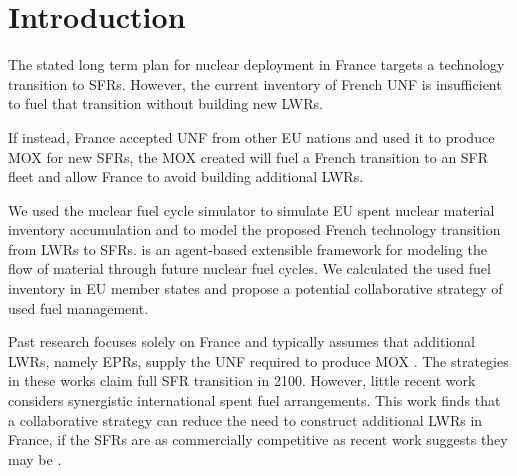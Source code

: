 
\section{Introduction}
The stated long term plan for nuclear deployment in France targets a technology 
transition to \glspl{SFR}\cite{cne2_reports_2015}. However, the current inventory of French \gls{UNF} 
is insufficient to fuel that transition without building new \glspl{LWR}.

If instead, France accepted 
\gls{UNF} from other \gls{EU} nations and used it to produce \gls{MOX} for new \glspl{SFR},
the \gls{MOX} created will fuel a French transition to an \gls{SFR} fleet
and allow France to avoid building additional \glspl{LWR}.


We used the \Cyclus nuclear fuel cycle simulator \cite{huff_fundamental_2016} to simulate
 \gls{EU} spent nuclear material inventory accumulation and to model the 
 proposed French 
 technology transition from \glspl{LWR} to
 \glspl{SFR}. \Cyclus is an agent-based extensible
framework for modeling the flow of material through future nuclear fuel cycles.
We calculated the used fuel
inventory in \gls{EU} member states and propose a potential collaborative
strategy of used fuel management.


Past research focuses solely on France and typically assumes that additional \glspl{LWR},
namely \glspl{EPR}, supply the \gls{UNF} required to produce \gls{MOX} \cite{carre_overview_2009, martin_symbiotic_2017, freynet_multiobjective_2016}. The strategies in these works claim
full \gls{SFR} transition in 2100.
However, little recent work considers synergistic international spent fuel arrangements.
This work finds that a collaborative strategy can reduce the
need to construct additional \glspl{LWR} in France, if 
the \glspl{SFR} are as commercially competitive as recent work
suggests they may be \cite{zhao_improving_2009}.